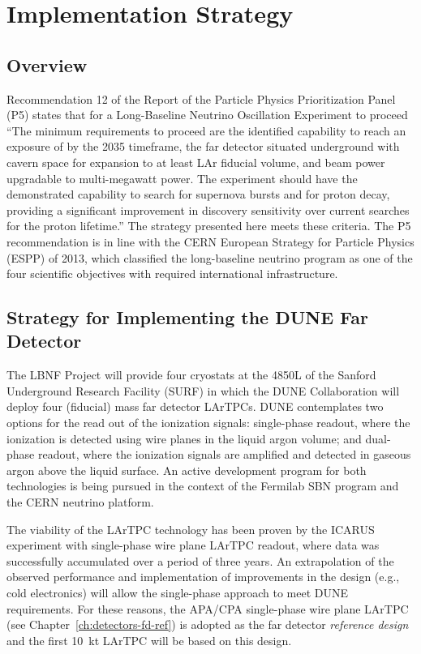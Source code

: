 \chapter{Implementation Strategy}
\label{ch:detectors-strategy}

\section{Overview}

Recommendation 12 of the Report of the Particle Physics Prioritization
Panel (P5) states that for a Long-Baseline Neutrino Oscillation
Experiment to proceed ``The minimum requirements to proceed are the
identified capability to reach an exposure of
 by the 2035 timeframe, the far detector
situated underground with cavern space for expansion to at least 
LAr fiducial volume, and  beam power upgradable to
multi-megawatt power. The experiment should have the demonstrated
capability to search for supernova bursts and for proton decay,
providing a significant improvement in discovery sensitivity over
current searches for the proton lifetime.''  The strategy presented
here meets these criteria.  The P5 recommendation is in line with the CERN
European Strategy for Particle Physics (ESPP) of 2013, which
classified the long-baseline neutrino program as one of the four
scientific objectives with required international infrastructure.

\section{Strategy for Implementing the DUNE Far Detector}

The LBNF Project will provide four cryostats at the 4850L of the Sanford
Underground Research Facility (SURF) in which the DUNE Collaboration
will deploy four  (fiducial) mass far detector LArTPCs. %
DUNE contemplates two options for the
read out of the ionization signals: single-phase readout, where the
ionization is detected using wire planes in the liquid argon volume;
and dual-phase readout, where the ionization signals are amplified and
detected in gaseous argon above the liquid surface.  An active
development program for both technologies is being pursued in the
context of the Fermilab SBN program and the CERN neutrino platform.

The viability of the LArTPC technology has been proven by the ICARUS
experiment with single-phase wire plane LArTPC readout, where data was
successfully accumulated over a period of three years.  An
extrapolation of the observed performance and implementation of
improvements in the design (e.g., cold electronics) will allow the
single-phase approach to meet DUNE requirements. For these reasons,
the APA/CPA single-phase wire plane LArTPC (see
Chapter~\ref{ch:detectors-fd-ref}) is adopted as the far detector
\textit{reference design} and the first 10~kt LArTPC will be based on
this design. 

